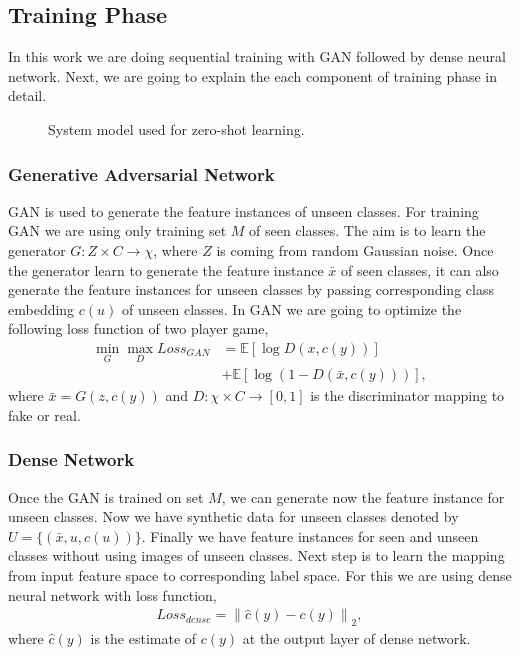 \documentclass[11pt, conference, english]{IEEEtran}
\theoremstyle{plain}
\theoremstyle{definition}
\theoremstyle{remark}
\newcommand{\eq}[1]{\begin{align*}#1\end{align*}}
\newcommand{\norm}[1]{\left\lVert#1\right\rVert}
\newcommand{\E}{\mathbb{E}}
\begin{document}
	
	\subsection{Training Phase}
	In this work we are doing sequential training with GAN followed by dense neural network. Next, we are going to explain the each component of training phase in detail.
		\begin{figure}[h!]
			\centering
			\caption{System model used for zero-shot learning.}
			\label{Fig:SystemModel}
		\end{figure}
	\subsubsection{Generative Adversarial Network } GAN is used to generate the feature instances of unseen classes. For training GAN we are using only training set $M$ of seen classes. The aim is to learn the generator $G:Z \times C \rightarrow \chi$, where $Z$ is coming from random Gaussian noise. Once the generator learn to generate the feature instance $\bar{x}$ of seen classes, it can also generate the feature instances for unseen classes by passing corresponding class embedding $c(u)$ of unseen classes. In GAN we are going to optimize the following loss function of two player game,
	\eq{\min_G \max_D Loss_{GAN}&=\E [\log D(x,c(y))]\\
		&+\E[\log(1-D(\bar{x},c(y)))],}
	where $\bar{x}=G(z,c(y))$ and $D:\chi \times C \rightarrow [0,1]$ is the discriminator mapping to fake or real.
	\subsubsection{Dense Network}
	 Once the GAN is trained on set $M$, we can generate now the feature instance for unseen classes. Now we have synthetic data for unseen classes denoted by 
	$U=\{(\bar{x},u,c(u))\}$. Finally we have feature instances for seen and unseen classes without using images of unseen classes. Next step is to learn the mapping from input feature space to corresponding label space. For this we are using dense neural network with loss function,
	\eq{Loss_{dense}=\norm{\hat{c}(y)-c(y)}_2,}
	where $\hat{c}(y)$ is the estimate of $c(y)$ at the output layer of dense network. 
	
\end{document}
